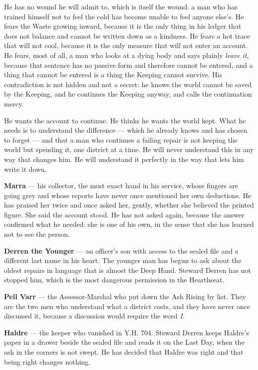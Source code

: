 \documentclass{design/chronicle}
\begin{document}
{
He has no wound he will admit to, which is itself the wound: a man who has trained himself not to feel the cold has become unable to feel anyone else’s. He fears the Waste growing inward, because it is the only thing in his ledger that does not balance and cannot be written down as a kindness. He fears a hot trace that will not cool, because it is the only measure that will not enter an account. He fears, most of all, a man who looks at a dying body and says plainly \emph{leave it}, because that sentence has no passive form and therefore cannot be entered, and a thing that cannot be entered is a thing the Keeping cannot survive. His contradiction is not hidden and not a secret: he knows the world cannot be saved by the Keeping, and he continues the Keeping anyway, and calls the continuation mercy.

He wants the account to continue. He thinks he wants the world kept. What he needs is to understand the difference — which he already knows and has chosen to forget — and that a man who continues a failing repair is not keeping the world but spending it, one district at a time. He will never understand this in any way that changes him. He will understand it perfectly in the way that lets him write it down.

\textbf{Marra} — his collector, the most exact hand in his service, whose fingers are going grey and whose reports have never once mentioned her own deductions. He has praised her twice and once asked her, gently, whether she believed the printed figure. She said the account stood. He has not asked again, because the answer confirmed what he needed: she is one of his own, in the sense that she has learned not to see the person.

\textbf{Derren the Younger} — an officer’s son with access to the sealed file and a different last name in his heart. The younger man has begun to ask about the oldest repairs in language that is almost the Deep Hand. Steward Derren has not stopped him, which is the most dangerous permission in the Hearthseat.

\textbf{Pell Varr} — the Assessor-Marshal who put down the Ash Rising by list. They are the two men who understand what a district costs, and they have never once discussed it, because a discussion would require the word \emph{I}.

\textbf{Haldre} — the keeper who vanished in Y.H. 704. Steward Derren keeps Haldre’s paper in a drawer beside the sealed file and reads it on the Last Day, when the ash in the corners is not swept. He has decided that Haldre was right and that being right changes nothing.

}
\end{document}
